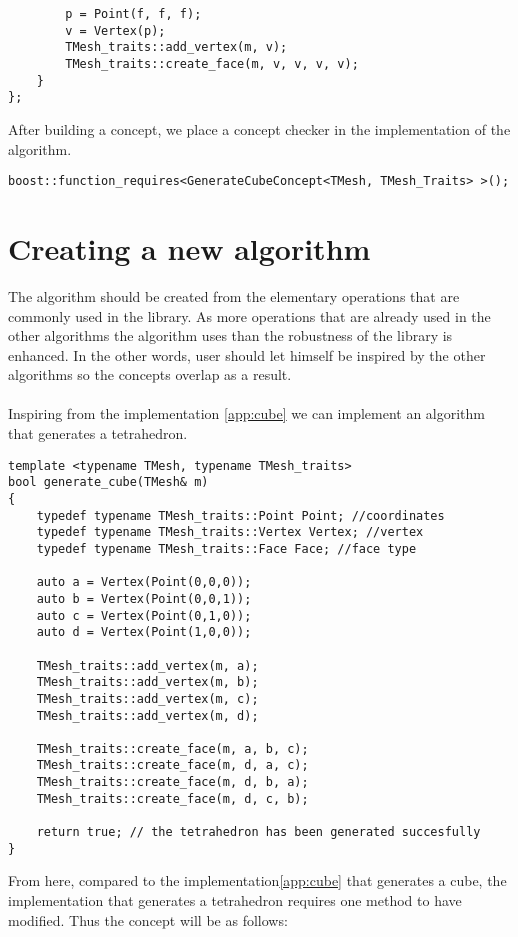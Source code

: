 \begin{appendices}
\begin{lstlisting}
		p = Point(f, f, f);
		v = Vertex(p);
		TMesh_traits::add_vertex(m, v);
		TMesh_traits::create_face(m, v, v, v, v);
	}
};
\end{lstlisting}

After building a concept, we place a concept checker in the implementation
of the algorithm.

\begin{lstlisting}
boost::function_requires<GenerateCubeConcept<TMesh, TMesh_Traits> >();
\end{lstlisting}

\section{Creating a new algorithm}

The algorithm should be created from the elementary operations that are commonly used in the
library. As more operations that are already used in the other algorithms
the algorithm uses than the robustness of the library is enhanced. In the other words,
user should let himself be inspired by the other algorithms so the concepts overlap as a result.
\\
\\
Inspiring from the implementation \ref{app:cube} we can implement an algorithm that generates
a tetrahedron.
\begin{lstlisting}
template <typename TMesh, typename TMesh_traits>
bool generate_cube(TMesh& m)
{
	typedef typename TMesh_traits::Point Point; //coordinates
	typedef typename TMesh_traits::Vertex Vertex; //vertex
	typedef typename TMesh_traits::Face Face; //face type
	
	auto a = Vertex(Point(0,0,0));
	auto b = Vertex(Point(0,0,1));
	auto c = Vertex(Point(0,1,0));
	auto d = Vertex(Point(1,0,0));
	
	TMesh_traits::add_vertex(m, a);
	TMesh_traits::add_vertex(m, b);
	TMesh_traits::add_vertex(m, c);
	TMesh_traits::add_vertex(m, d);

	TMesh_traits::create_face(m, a, b, c);
	TMesh_traits::create_face(m, d, a, c);
	TMesh_traits::create_face(m, d, b, a);
	TMesh_traits::create_face(m, d, c, b);
	
	return true; // the tetrahedron has been generated succesfully
}
\end{lstlisting}

From here, compared to the implementation\ref{app:cube} that generates a cube, the implementation
that generates a tetrahedron requires one method to have modified. Thus the concept will be as follows:


\end{appendices}
